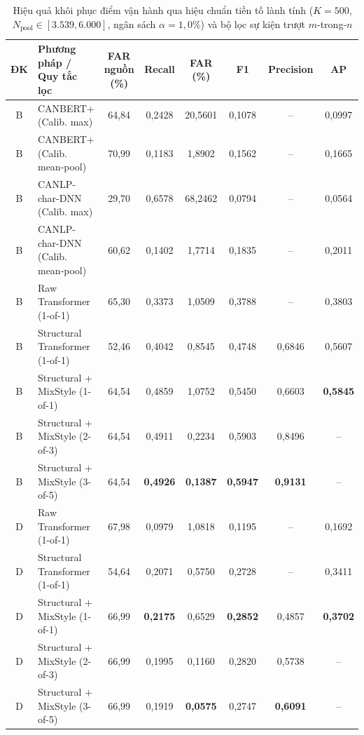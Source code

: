 \documentclass[12pt, a4paper, reqno, oneside]{book}
\begin{document}
\begin{table}[htbp]
  \centering
  \caption[Hiệu quả khôi phục điểm vận hành qua hiệu chuẩn tiền tố lành tính và lọc trượt]{Hiệu quả khôi phục điểm vận hành qua hiệu chuẩn tiền tố lành tính ($K=500$, $N_{\text{pool}} \in [3.539, 6.000]$, ngân sách $\alpha=1{,}0\%$) và bộ lọc sự kiện trượt $m$-trong-$n$}
  \label{tab:stage2-calibration}
  \footnotesize
  \begin{tabular}{@{}c l c c c c c c@{}}
    \toprule
    \textbf{ĐK} & \textbf{Phương pháp / Quy tắc lọc} & \textbf{FAR nguồn (\%)} & \textbf{Recall} & \textbf{FAR (\%)} & \textbf{F1} & \textbf{Precision} & \textbf{AP} \\
    \midrule
    B & CANBERT+ (Calib. max) & 64,84 & 0,2428 & 20,5601 & 0,1078 & -- & 0,0997 \\
    B & CANBERT+ (Calib. mean-pool) & 70,99 & 0,1183 & 1,8902 & 0,1562 & -- & 0,1665 \\
    B & CANLP-char-DNN (Calib. max) & 29,70 & 0,6578 & 68,2462 & 0,0794 & -- & 0,0564 \\
    B & CANLP-char-DNN (Calib. mean-pool) & 60,62 & 0,1402 & 1,7714 & 0,1835 & -- & 0,2011 \\
    B & Raw Transformer (1-of-1) & 65,30 & 0,3373 & 1,0509 & 0,3788 & -- & 0,3803 \\
    B & Structural Transformer (1-of-1) & 52,46 & 0,4042 & 0,8545 & 0,4748 & 0,6846 & 0,5607 \\
    B & Structural + MixStyle (1-of-1) & 64,54 & 0,4859 & 1,0752 & 0,5450 & 0,6603 & \textbf{0,5845} \\
    B & Structural + MixStyle (2-of-3) & 64,54 & 0,4911 & 0,2234 & 0,5903 & 0,8496 & -- \\
    B & Structural + MixStyle (3-of-5) & 64,54 & \textbf{0,4926} & \textbf{0,1387} & \textbf{0,5947} & \textbf{0,9131} & -- \\
    \midrule
    D & Raw Transformer (1-of-1) & 67,98 & 0,0979 & 1,0818 & 0,1195 & -- & 0,1692 \\
    D & Structural Transformer (1-of-1) & 54,64 & 0,2071 & 0,5750 & 0,2728 & -- & 0,3411 \\
    D & Structural + MixStyle (1-of-1) & 66,99 & \textbf{0,2175} & 0,6529 & \textbf{0,2852} & 0,4857 & \textbf{0,3702} \\
    D & Structural + MixStyle (2-of-3) & 66,99 & 0,1995 & 0,1160 & 0,2820 & 0,5738 & -- \\
    D & Structural + MixStyle (3-of-5) & 66,99 & 0,1919 & \textbf{0,0575} & 0,2747 & \textbf{0,6091} & -- \\
    \bottomrule
  \end{tabular}
\end{table}
\end{document}
